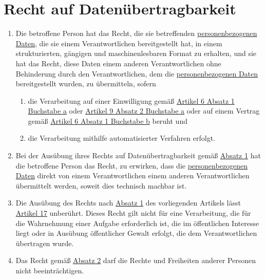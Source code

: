 \chapter{Recht auf Datenübertragbarkeit}
\label{ch:20}


\begin{enumerate}

  \item Die betroffene Person hat das Recht, die sie betreffenden \hyperref[itm:04-1]{personenbezogenen Daten}, die sie einem
   Verantwortlichen bereitgestellt hat, in einem strukturierten, gängigen und maschinenlesbaren Format zu erhalten, und
   sie hat das Recht, diese Daten einem anderen Verantwortlichen ohne Behinderung durch den Verantwortlichen, dem die
   \hyperref[itm:04-1]{personenbezogenen Daten} bereitgestellt wurden, zu übermitteln, sofern
  \label{itm:20-1}

  \begin{enumerate}
  
    \item die Verarbeitung auf einer Einwilligung gemäß \hyperref[itm:06-1a]{Artikel 6 Absatz 1 Buchstabe a} oder
    \hyperref[itm:09-2a]{Artikel 9 Absatz 2 Buchstabe a} oder auf einem Vertrag gemäß \hyperref[itm:06-1b]{Artikel 6
     Absatz 1 Buchstabe b} beruht und
  \label{itm:20-1a}

    \item die Verarbeitung mithilfe automatisierter Verfahren erfolgt.
  \label{itm:20-1b}

  \end{enumerate}

  \item Bei der Ausübung ihres Rechts auf Datenübertragbarkeit gemäß \hyperref[itm:20-1]{Absatz 1} hat die betroffene
   Person das Recht, zu erwirken, dass die \hyperref[itm:04-1]{personenbezogenen Daten} direkt von einem Verantwortlichen einem anderen
   Verantwortlichen übermittelt werden, soweit dies technisch machbar ist.
  \label{itm:20-2}

  \item Die Ausübung des Rechts nach \hyperref[itm:20-1]{Absatz 1} des vorliegenden Artikels lässt \hyperref[ch:17]
   {Artikel 17} unberührt. Dieses Recht gilt nicht für eine Verarbeitung, die für die Wahrnehmung einer Aufgabe
   erforderlich ist, die im öffentlichen Interesse liegt oder in Ausübung öffentlicher Gewalt erfolgt, die dem
   Verantwortlichen übertragen wurde.
  \label{itm:20-3}

  \item Das Recht gemäß \hyperref[itm:20-2]{Absatz 2} darf die Rechte und Freiheiten anderer Personen nicht
   beeinträchtigen.
  \label{itm:20-4}

\end{enumerate}


